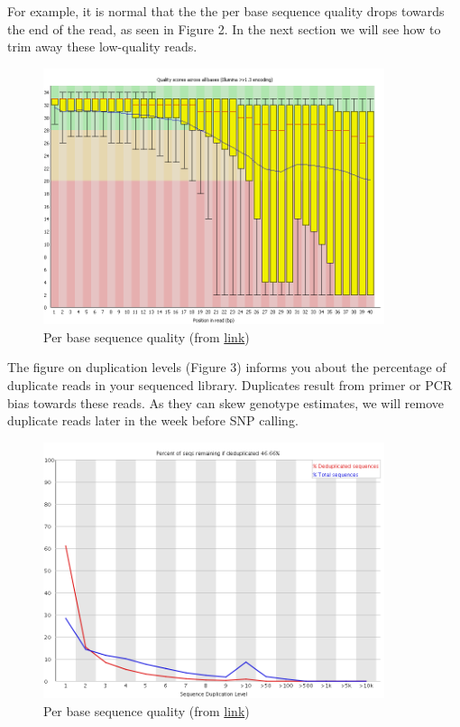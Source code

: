 \documentclass[11pt]{article}
\begin{document}
For example, it is normal that the the per base sequence quality drops
towards the end of the read, as seen in Figure 2. In the next section
we will see how to trim away these low-quality reads.

\begin{figure}[htb]
\centering
\includegraphics[width=10cm]{per_base_quality.png}
\caption{Per base sequence quality (from \href{http://www.bioinformatics.babraham.ac.uk/projects/fastqc/Help/3\%20Analysis\%20Modules/2\%20Per\%20Base\%20Sequence\%20Quality.html}{link})}
\end{figure}

The figure on duplication levels (Figure 3) informs you about the
percentage of duplicate reads in your sequenced library.  Duplicates
result from primer or PCR bias towards these reads.  As they can skew
genotype estimates, we will remove duplicate reads later in the week
before SNP calling.

\begin{figure}[htb]
\centering
\includegraphics[width=10cm]{duplication_levels.png}
\caption{Per base sequence quality (from \href{http://www.bioinformatics.babraham.ac.uk/projects/fastqc/Help/3\%20Analysis\%20Modules/8\%20Duplicate\%20Sequences.html}{link})}
\end{figure}
\end{document}
